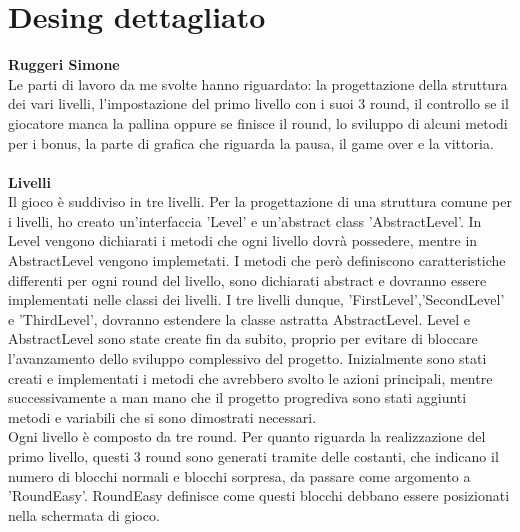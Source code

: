 \documentclass[a4paper,12pt]{report}
\begin{document}
\section{Desing dettagliato}
\textbf{Ruggeri Simone}\\
Le parti di lavoro da me svolte hanno riguardato: la progettazione della struttura dei vari livelli,
l'impostazione del primo livello con i suoi 3 round, il controllo se il giocatore manca la pallina oppure se finisce il round, lo sviluppo di
alcuni metodi per i bonus, la parte di grafica che riguarda la pausa, il game over e la vittoria.\\\\
\textbf{Livelli}\\
Il gioco è suddiviso in tre livelli. Per la progettazione di una struttura comune per i livelli, ho creato un'interfaccia 'Level' e
un'abstract class 'AbstractLevel'. In Level vengono dichiarati i metodi che ogni livello dovrà possedere, mentre in AbstractLevel vengono implemetati. I metodi che
però definiscono caratteristiche differenti per ogni round del livello, sono dichiarati abstract e dovranno essere implementati nelle classi dei livelli. I tre livelli
dunque, 'FirstLevel','SecondLevel' e 'ThirdLevel', dovranno estendere la classe astratta AbstractLevel.
Level e AbstractLevel sono state create fin da subito, proprio per evitare di bloccare l'avanzamento dello sviluppo complessivo del progetto.
Inizialmente sono stati creati e implementati i metodi che avrebbero svolto le azioni principali, mentre successivamente a man mano che il progetto progrediva
sono stati aggiunti metodi e variabili che si sono dimostrati necessari.\\
Ogni livello è composto da tre round. Per quanto riguarda la realizzazione del primo livello, questi 3 round sono generati tramite delle costanti, che indicano
il numero di blocchi normali e blocchi sorpresa, da passare come argomento a 'RoundEasy'. RoundEasy definisce come questi blocchi debbano essere posizionati
nella schermata di gioco.
\end{document}

